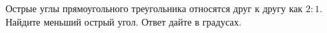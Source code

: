 \begin{ex}
	\begin{condition}
		Острые углы прямоугольного треугольника относятся друг к другу как \( 2:1 \). Найдите меньший острый угол. Ответ дайте в градусах.
	\end{condition}
\end{ex}
